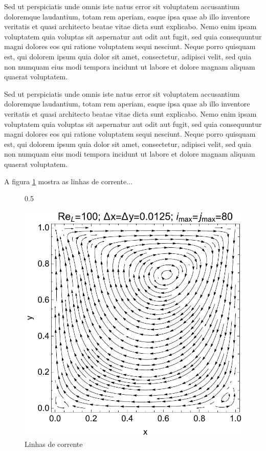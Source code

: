 Sed ut perspiciatis unde omnis iste natus error sit voluptatem accusantium doloremque laudantium, totam rem aperiam, eaque ipsa quae ab illo inventore veritatis et quasi architecto beatae vitae dicta sunt explicabo. Nemo enim ipsam voluptatem quia voluptas sit aspernatur aut odit aut fugit, sed quia consequuntur magni dolores eos qui ratione voluptatem sequi nesciunt. Neque porro quisquam est, qui dolorem ipsum quia dolor sit amet, consectetur, adipisci velit, sed quia non numquam eius modi tempora incidunt ut labore et dolore magnam aliquam quaerat voluptatem.

Sed ut perspiciatis unde omnis iste natus error sit voluptatem accusantium doloremque laudantium, totam rem aperiam, eaque ipsa quae ab illo inventore veritatis et quasi architecto beatae vitae dicta sunt explicabo. Nemo enim ipsam voluptatem quia voluptas sit aspernatur aut odit aut fugit, sed quia consequuntur magni dolores eos qui ratione voluptatem sequi nesciunt. Neque porro quisquam est, qui dolorem ipsum quia dolor sit amet, consectetur, adipisci velit, sed quia non numquam eius modi tempora incidunt ut labore et dolore magnam aliquam quaerat voluptatem.


A figura \ref{fig:LinhasDeCorrente} mostra as linhas de corrente...



\begin{figure}[!h]{0.5\textwidth}
	\caption{Linhas de corrente} \label{fig:LinhasDeCorrente}
	\includegraphics[width=\hsize]{Figures/StreamLines.pdf}
\end{figure}



